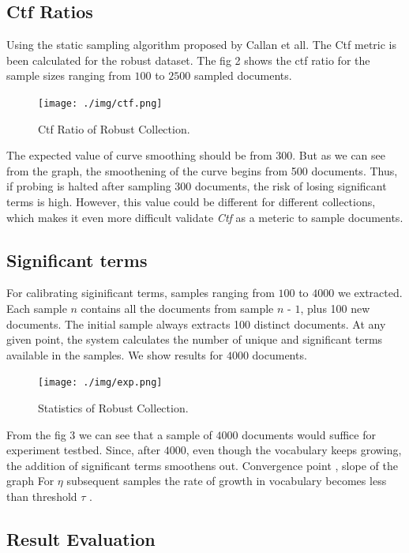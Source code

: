 \documentclass[paper=a4, fontsize=11pt,twoside]{scrartcl}	%
\begin{document}

\subsection{Ctf Ratios}
Using the static sampling algorithm proposed by Callan et all. The Ctf metric is been calculated for the robust dataset. The fig 2 shows the ctf ratio for the sample sizes ranging from $100$ to $2500$ sampled documents. 

\begin{figure}[H]
\centering
\texttt{[image: ./img/ctf.png]}
\caption{\label{fig:2}Ctf Ratio of Robust Collection.}
\end{figure}

The expected value of curve smoothing should be from 300. But as we can see from the graph, the smoothening of the curve begins from 500 documents. Thus, if probing is halted after sampling 300 documents,
the risk of losing significant terms is high. However, this value could be different for different collections, which makes it even more difficult validate \textit{Ctf} as a meteric to sample documents.

\subsection{Significant terms}

For calibrating siginificant terms, samples ranging from $100$ to $4000$ we extracted. Each sample $n$ contains all the documents from sample $n$ - $1$, plus 100 new documents. The initial sample always extracts 100 distinct documents. At any given point, the system calculates the number of unique and significant terms
available in the samples. We show results for $4000$ documents.

\begin{figure}[H]
\centering
\texttt{[image: ./img/exp.png]}
\caption{\label{fig:3}Statistics of Robust Collection.}
\end{figure}

From the fig 3 we can see that a sample of $4000$ documents would suffice for experiment testbed. Since, after $4000$, even though the vocabulary keeps growing, the addition of significant terms smoothens out. 
Convergence point , slope of the graph
For $\eta$  subsequent samples the rate of growth in vocabulary becomes less than threshold $\tau$ .


\subsection{Result Evaluation}
\end{document}
